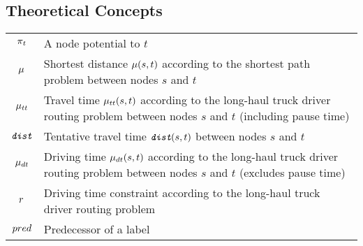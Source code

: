 \subsection{Theoretical Concepts}
\begin{tabular}{cp{}}
	$\pi_t$    & A node potential to $t$                                                                                                                  \\
	$\mu$       & Shortest distance $\mu(s,t)$ according to the shortest path problem between nodes $s$ and $t$                                      \\
	$\mu_{tt}$     & Travel time $\mu_{tt}(s,t)$ according to the long-haul truck driver routing problem between nodes $s$ and $t$ (including pause time)  \\
	$\texttt{\itshape dist}$ & Tentative travel time $\texttt{\itshape dist}(s,t)$ between nodes $s$ and $t$                                                                   \\
	$\mu_{dt}$    & Driving time $\mu_{dt}(s,t)$ according to the long-haul truck driver routing problem between nodes $s$ and $t$ (excludes pause time) \\
	$r$          & Driving time constraint according to the long-haul truck driver routing problem                                                          \\
	$pred$           & Predecessor of a label                                                                                                                   \\
\end{tabular}


